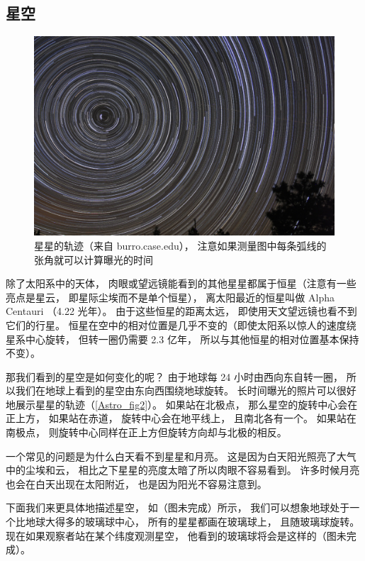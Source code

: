 \subsection{星空}

\begin{figure}[ht]
\centering
\includegraphics[width=14cm]{./figures/Astro2.pdf}
\caption{星星的轨迹（来自 burro.case.edu）， 注意如果测量图中每条弧线的张角就可以计算曝光的时间} \label{Astro_fig2}
\end{figure}

除了太阳系中的天体， 肉眼或望远镜能看到的其他星星都属于恒星（注意有一些亮点是星云， 即星际尘埃而不是单个恒星）， 离太阳最近的恒星叫做 Alpha Centauri （4.22 光年）。 由于这些恒星的距离太远， 即使用天文望远镜也看不到它们的行星。 恒星在空中的相对位置是几乎不变的（即使太阳系以惊人的速度绕星系中心旋转， 但转一圈仍需要 2.3 亿年， 所以与其他恒星的相对位置基本保持不变）。

那我们看到的星空是如何变化的呢？ 由于地球每 24 小时由西向东自转一圈， 所以我们在地球上看到的星空由东向西围绕地球旋转。 长时间曝光的照片可以很好地展示星星的轨迹（\autoref{Astro_fig2}）。 如果站在北极点， 那么星空的旋转中心会在正上方， 如果站在赤道， 旋转中心会在地平线上， 且南北各有一个。 如果站在南极点， 则旋转中心同样在正上方但旋转方向却与北极的相反。

一个常见的问题是为什么白天看不到星星和月亮。 这是因为白天阳光照亮了大气中的尘埃和云， 相比之下星星的亮度太暗了所以肉眼不容易看到。 许多时候月亮也会在白天出现在太阳附近， 也是因为阳光不容易注意到。

下面我们来更具体地描述星空， 如（图未完成）所示， 我们可以想象地球处于一个比地球大得多的玻璃球中心， 所有的星星都画在玻璃球上， 且随玻璃球旋转。 现在如果观察者站在某个纬度观测星空， 他看到的玻璃球将会是这样的（图未完成）。



